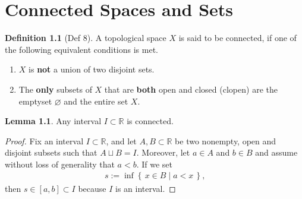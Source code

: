\documentclass[a4paper]{book}
\theoremstyle{definition}
\newtheorem{definition}{Definition}[chapter]
\newtheorem{lemma}{Lemma}[definition]
\newcommand{\makeset}[2]{\left\{\, #1 \mid #2 \,\right\}}
\begin{document}
    \chapter{Connected Spaces and Sets}
    \begin{defbox}
        \begin{definition}[Def 8]
            A {\color{mathobj}topological space} \(X\) is said to be {\color{maththen}connected}, if one of the following {\color{mathrem}equivalent} conditions is met.
            \begin{enumerate}
                \item \(X\) is \textbf{not} a {\color{mathif}union} of two {\color{mathif}disjoint} sets.
                \item The \textbf{only} {\color{mathif}subsets} of \(X\) that are \textbf{both} {\color{mathif}open} and {\color{mathif}closed} ({\color{mathrem}clopen}) are the emptyset \(\varnothing\) and the entire set \(X\).
            \end{enumerate}
        \end{definition}
    \end{defbox}

\begin{thmbox}
    \begin{lemma}
        Any {\color{mathif}interval} \(I \subset \mathbb{R}\) is {\color{maththen}connected}.
    \end{lemma}
\end{thmbox}

\begin{proof}
    Fix an interval \(I \subset \mathbb{R}\), and let \(A, B \subset \mathbb{R}\) be two nonempty, open and disjoint subsets such that \(A \sqcup B = I\). Moreover, let \(a \in A\) and \(b \in B\) and assume without loss of generality that \(a < b\). If we set
    \begin{align}
        s := \inf \makeset{x \in B}{a < x} \text{,}
    \end{align}
    then \(s \in [a, b] \subset I\) because \(I\) is an interval.   
\end{proof}
\end{document}
